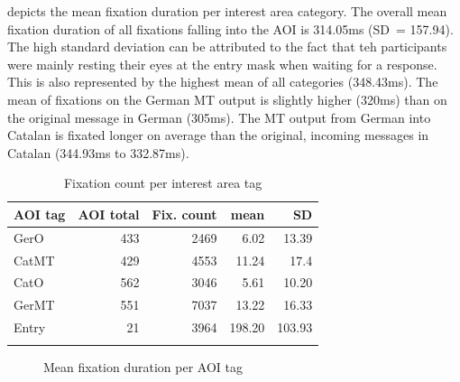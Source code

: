 \documentclass[output=paper]{langscibook}
\begin{document}
 depicts the mean fixation duration per interest area category. The overall mean fixation duration of all fixations falling into the AOI is 314.05ms (SD~= 157.94). The high standard deviation can be attributed to the fact that teh participants were mainly resting their eyes at the entry mask when waiting for a response. This is also represented by the highest mean of all categories (348.43ms). The mean of fixations on the German MT output is slightly higher (320ms) than on the original message in German (305ms). The MT output from German into Catalan is fixated longer on average than the original, incoming messages in Catalan (344.93ms to 332.87ms).

\begin{table}
\caption{Fixation count per interest area tag}
\label{tab:fixcount}
 \begin{tabular}{lrrrr}
  \lsptoprule
             AOI tag & AOI total & Fix. count & mean & SD \\ 
  \midrule
  GerO  & 433 & 2469 & 6.02 & 13.39 \\
  CatMT  & 429  & 4553 & 11.24 & 17.4\\
  CatO  & 562  & 3046 & 5.61 & 10.20\\
  GerMT  & 551  & 7037 & 13.22 & 16.33\\
  Entry  & 21 & 3964 & 198.20 & 103.93\\
  \lspbottomrule
 \end{tabular}
\end{table}

\begin{figure}

    \caption{Mean fixation duration per AOI tag}
    \label{fixDur_AOI}
\end{figure}
\end{document}
